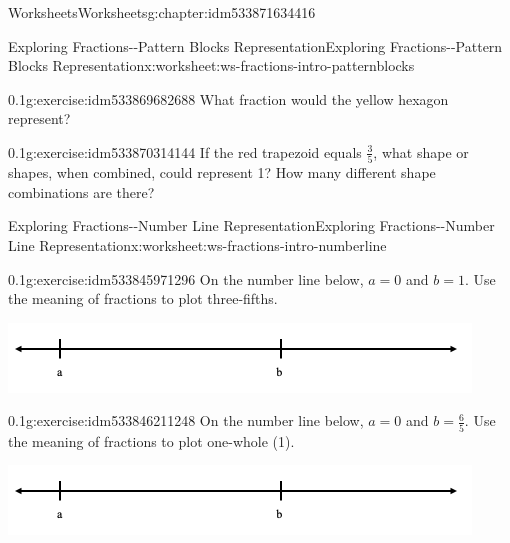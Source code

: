 \documentclass[twoside,11pt,]{book}
\begin{document}
\begin{chapterptx}{Worksheets}{}{Worksheets}{}{}{g:chapter:idm533871634416}
\begin{worksheet-section-numberless}{Exploring Fractions-{}-{}Pattern Blocks Representation}{}{Exploring Fractions-{}-{}Pattern Blocks Representation}{}{}{x:worksheet:ws-fractions-intro-patternblocks}
\begin{divisionexercise}{9}{}{0.1}{g:exercise:idm533869682688}
What fraction would the yellow hexagon represent?%
\end{divisionexercise}%
\begin{divisionexercise}{10}{}{0.1}{g:exercise:idm533870314144}%
If the red trapezoid equals \(\frac{3}{5} \), what shape or shapes, when combined, could represent 1?  How many different shape combinations are there?%
\end{divisionexercise}%
\end{worksheet-section-numberless}
\restoregeometry
%
%
\typeout{************************************************}
\typeout{************************************************}
%
\begin{worksheet-section-numberless}{Exploring Fractions-{}-{}Number Line Representation}{}{Exploring Fractions-{}-{}Number Line Representation}{}{}{x:worksheet:ws-fractions-intro-numberline}
\begin{divisionexercise}{1}{}{0.1}{g:exercise:idm533845971296}%
On the number line below, \(a= 0 \) and \(b=1 \).  Use the meaning of fractions to plot three-fifths.%
\begin{sidebyside}{1}{0}{0}{0}%
\begin{sbspanel}{1}%
\includegraphics[width=1\linewidth]{images/fractions-number-line.png}
\end{sbspanel}%
\end{sidebyside}%
\end{divisionexercise}%
\begin{divisionexercise}{2}{}{0.1}{g:exercise:idm533846211248}%
On the number line below, \(a= 0 \) and \(b=\frac{6}{5} \).  Use the meaning of fractions to plot one-whole (1).%
\begin{sidebyside}{1}{0}{0}{0}%
\begin{sbspanel}{1}%
\includegraphics[width=1\linewidth]{images/fractions-number-line.png}
\end{sbspanel}%
\end{sidebyside}%

\end{divisionexercise}
\end{worksheet-section-numberless}
\end{chapterptx}
\end{document}
